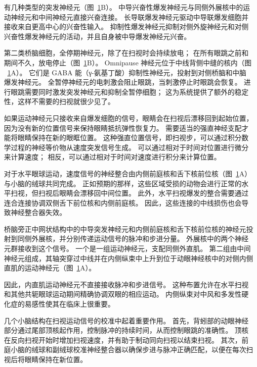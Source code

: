 \begin{figure}[htbp]
	\label{fig:35_8}
\end{figure}


有几种类型的突发神经元（图~\ref{fig:35_8}B）。 中导兴奋性爆发神经元与同侧外展核中的运动神经元和中间神经元直接兴奋连接。
长导联爆发神经元驱动中导联爆发细胞并接收来自更高中心的兴奋性输入。
抑制性爆发神经元抑制对侧外旋神经元和对侧兴奋性爆发神经元的活动，并且自身被中导爆发神经元兴奋。


第二类桥脑细胞，全停期神经元，除了在扫视时会持续放电；
在所有眼跳之前和期间不久，放电停止（图~\ref{fig:35_8}B）。
Omnipause 神经元位于中线背侧中缝的核内（图 ~\ref{fig:35_8}A）。
它们是 GABA 能（γ-氨基丁酸）抑制性神经元，投射到对侧桥脑和中脑爆发神经元。
全暂停神经元的电刺激会阻止眼跳，当刺激停止时眼跳会恢复。
进行眼跳需要同时激发突发神经元和抑制全暂停细胞；
这为系统提供了额外的稳定性，这样不需要的扫视就很少见了。


如果运动神经元只接收来自爆发细胞的信号，眼睛会在扫视后漂移回到起始位置，因为没有新的位置信号来保持眼睛抵抗弹性恢复力。
需要适当的强直神经支配才能将眼睛保持在新的眼眶位置。
这种强直位置信号，即扫视步，可以通过积分数学过程的神经等价物从速度突发信号生成。
可以通过相对于时间对位置进行微分来计算速度；
相反，可以通过相对于时间对速度进行积分来计算位置。


对于水平眼球运动，速度信号的神经整合由内侧前庭核和舌下核前位核（图~\ref{fig:35_8}A）与小脑的绒球共同完成。
正如预期的那样，这些区域受损的动物会进行正常的水平扫视，但扫视后眼睛会漂移回中间位置。
此外，水平扫视爆发的整合需要通过连合连接协调双侧舌下前位核和内侧前庭核。
因此，这些连接的中线损伤也会导致神经整合器失效。


桥脑旁正中网状结构中的中导突发神经元和内侧前庭核和舌下核前位核的神经元投射到同侧外展核，并分别传递运动信号的脉冲和步进分量。
外展核中的两个神经元群接收到这个信号。
一个是一组运动神经元，支配同侧外直肌。
第二组由中间神经元组成，其轴突穿过中线并在内侧纵束中上升到位于动眼神经核中的对侧内侧直肌的运动神经元（图~\ref{fig:35_8}A）。


因此，内直肌运动神经元不直接接收脉冲和步进信号。
这种布置允许在水平扫视和其他共轭眼球运动期间精确协调双眼的相应运动。
内侧纵束对中风和多发性硬化症的易感性使其在临床上很重要。


几个小脑结构在扫视运动信号的校准中起着重要作用。
首先，背蚓部的动眼神经部分通过尾部顶核起作用，控制脉冲的持续时间，从而控制眼跳的准确性。
顶核在反向扫视开始时增加扫视速度，并有助于制动同向扫视以结束扫视。
其次，前庭小脑的绒球和副绒球校准神经整合器以确保步进与脉冲正确匹配，以便在每次扫视后将眼睛保持在新位置。



